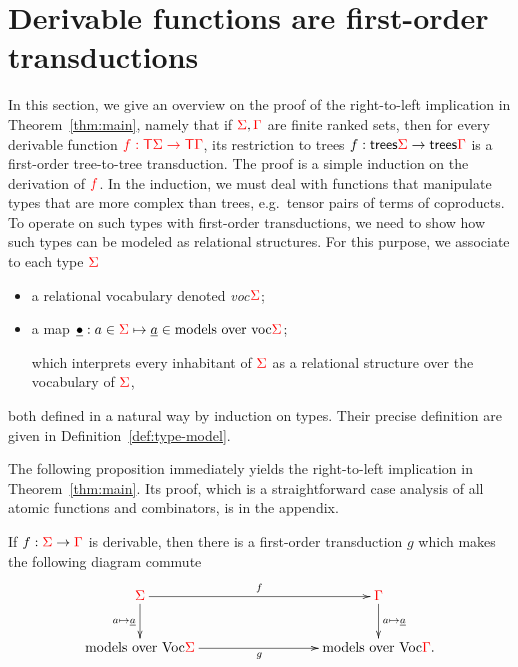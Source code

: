 \newcommand{\Root}[1]{\mathsf{root}_{#1}}
\newcommand{\Port}[1]{\mathsf{port}_{#1}}
\newcommand{\Interface}[1]{\mathsf{Interface}_{#1}}
\section{Derivable functions are first-order transductions}
\label{sec:to-transductions}
In this section, we give an overview on the proof of the right-to-left implication in Theorem~\ref{thm:main}, namely that if ${\color{red}{\Sigma}},{\color{red}{\Gamma}}$ are finite ranked sets, then for every derivable function ${\color{red}{f : {\color{red}{\mathsf T}}{\color{red}{\Sigma}}\to {\color{red}{\mathsf T}}{\color{red}{\Gamma}}}}$, its restriction to trees $f : \mathsf {trees} {\color{red}{\Sigma}} \to \mathsf {trees} {\color{red}{\Gamma}}$
is a first-order tree-to-tree transduction. The proof is a simple induction on the derivation of  ${\color{red}{f}}$. In the induction, we must deal with functions that manipulate types that are more complex than trees, e.g.~tensor pairs of terms of coproducts.  To operate on such types with first-order transductions, we need to show how such types can be modeled as relational structures. For this purpose, we associate to each type ${\color{red}{\Sigma}}$
\begin{itemize}
\item a relational vocabulary denoted  \emph{voc$ {\color{red}{\Sigma}}$};
\item a map $\underline{\bullet}: a \in {\color{red}{\Sigma}}  \mapsto \underline a \in \text{models over voc$ {\color{red}{\Sigma}}$}$;

    which interprets every inhabitant of ${\color{red}{\Sigma}}$ as a relational structure over the vocabulary of ${\color{red}{\Sigma}}$,
\end{itemize}
both defined in a natural way by induction on types. Their precise definition are given in  Definition~\ref{def:type-model}.
    \smallskip

The following proposition immediately yields the right-to-left implication in Theorem~\ref{thm:main}. Its proof, which is a straightforward case analysis of all atomic functions and combinators, is in the appendix. 


  
\begin{proposition}\label{prop:to-logic} If $f : {\color{red}{\Sigma}} \to {\color{red}{\Gamma}}$ is derivable, then there is a first-order transduction $g$ 
    which makes the following diagram commute
    \begin{align*}
        \xymatrix@C=3cm{
            \rSigma \ar[d]_{a \mapsto \underline a}\ar[r]^f &  \rGamma \ar[d]^{a \mapsto \underline a} \\
            \text{models over  Voc$\rSigma$} \ar[r]_g &  \text{models over Voc$ \rGamma$}.
        } 
    \end{align*}
\end{proposition}




